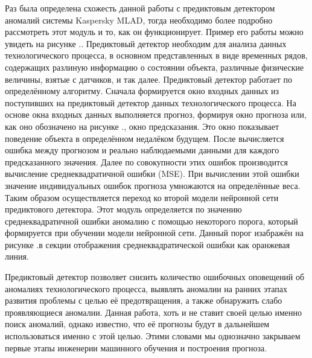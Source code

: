 {  \par \redline Раз была определена схожесть данной работы с предиктовым детектором аномалий системы Kaspersky MLAD, тогда необходимо более подробно рассмотреть этот модуль и то, как он функционирует. Пример его работы можно увидеть на рисунке \thechaptercntr .\theimagecntr. Предиктовый детектор необходим для анализа данных технологического процесса, в основном представленных в виде временных рядов, содержащих разлиную информацию о состоянии объекта, различные физические величины, взятые с датчиков, и так далее. Предиктовый детектор работает по определённому алгоритму. Сначала формируется окно входных данных из поступивших на предиктовый детектор данных технологического процесса. На основе окна входных данных выполняется прогноз, формируя окно прогноза или, как оно обозначено на рисунке \thechaptercntr .\theimagecntr, окно предсказания. Это окно показывает поведение объекта в определённом недалёком будущем. После вычисляется ошибка между прогнозом и реально наблюдаемыми данными для каждого предсказанного значения. Далее по совокупности этих ошибок производится вычисление среднеквадратичной ошибки (MSE). При вычислении этой ошибки значение индивидуальных ошибок прогноза умножаются на определённые веса. Таким образом осуществляется переход ко второй модели нейронной сети предиктового детектора. Этот модуль определяется по значению среднеквадратичной ошибки аномалию с помощью некоторого порога, который формируется при обучении модели нейронной сети. Данный порог изабражён на рисунке \thechaptercntr .\theimagecntr \spc в секции отображения среднеквадратической ошибки как оранжевая линия. \addtocounter{imagecntr}{1}

  \par \redline Предиктовый детектор позволяет снизить количество ошибочных оповещений об аномалиях технологического процесса, выявлять аномалии на ранних этапах развития проблемы с целью её предотвращения, а также обнаружить слабо проявляющиеся аномалии. Данная работа, хоть и не ставит своей целью именно поиск аномалий, однако известно, что её прогнозы будут в дальнейшем использоваться именно с этой целью. Этими словами мы однозначно закрываем первые этапы инженерии машинного обучения и построения прогноза.

  \par
}

\setcounter{subchaptercntr}{1}
\setcounter{formulacntr}{1}
\setcounter{imagecntr}{1}
